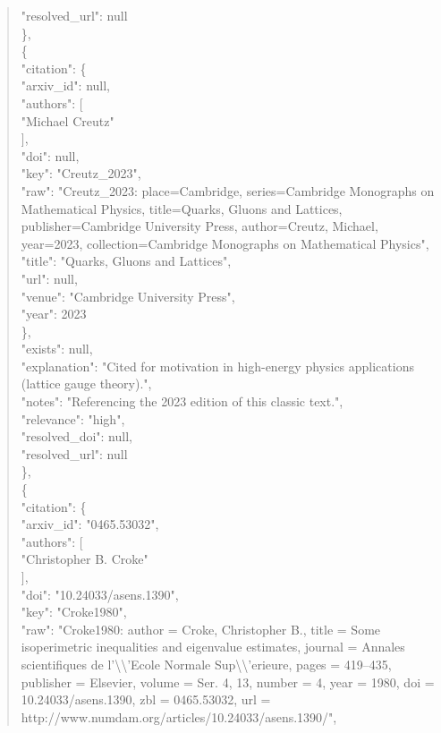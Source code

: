 \documentclass[11pt]{article}
\begin{document}
\begin{quote}
      "resolved\_url": null\\
    \},\\
    \{\\
      "citation": \{\\
        "arxiv\_id": null,\\
        "authors": [\\
          "Michael Creutz"\\
        ],\\
        "doi": null,\\
        "key": "Creutz\_2023",\\
        "raw": "Creutz\_2023: place=Cambridge, series=Cambridge Monographs on Mathematical Physics, title=Quarks, Gluons and Lattices, publisher=Cambridge University Press, author=Creutz, Michael, year=2023, collection=Cambridge Monographs on Mathematical Physics",\\
        "title": "Quarks, Gluons and Lattices",\\
        "url": null,\\
        "venue": "Cambridge University Press",\\
        "year": 2023\\
      \},\\
      "exists": null,\\
      "explanation": "Cited for motivation in high-energy physics applications (lattice gauge theory).",\\
      "notes": "Referencing the 2023 edition of this classic text.",\\
      "relevance": "high",\\
      "resolved\_doi": null,\\
      "resolved\_url": null\\
    \},\\
    \{\\
      "citation": \{\\
        "arxiv\_id": "0465.53032",\\
        "authors": [\\
          "Christopher B. Croke"\\
        ],\\
        "doi": "10.24033/asens.1390",\\
        "key": "Croke1980",\\
        "raw": "Croke1980: author = Croke, Christopher B., title = Some isoperimetric inequalities and eigenvalue estimates, journal = Annales scientifiques de l'\textbackslash{}\textbackslash{}'Ecole Normale Sup\textbackslash{}\textbackslash{}'erieure, pages = 419--435, publisher = Elsevier, volume = Ser. 4, 13, number = 4, year = 1980, doi = 10.24033/asens.1390, zbl = 0465.53032, url = http://www.numdam.org/articles/10.24033/asens.1390/",\\

\end{quote}
\end{document}
